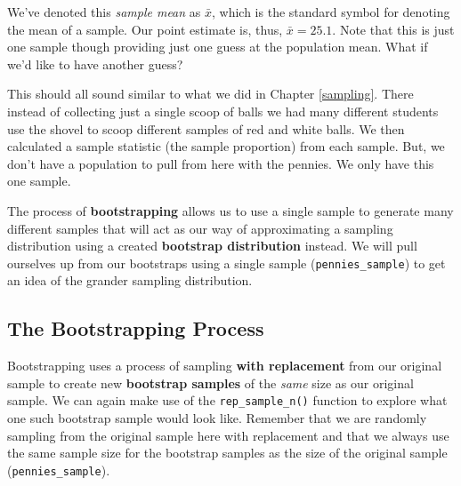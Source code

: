 \documentclass[12pt, krantz2,]{krantz}
\makeatletter
\newenvironment{Shaded}{\begin{snugshade}}{\end{snugshade}}
\newcommand{\DataTypeTok}[1]{\textcolor[rgb]{0.27,0.27,0.27}{#1}}
\newcommand{\DecValTok}[1]{\textcolor[rgb]{0.06,0.06,0.06}{#1}}
\newcommand{\KeywordTok}[1]{\textcolor[rgb]{0.27,0.27,0.27}{\textbf{#1}}}
\newcommand{\NormalTok}[1]{#1}
\newcommand{\OperatorTok}[1]{\textcolor[rgb]{0.43,0.43,0.43}{\textbf{#1}}}
\newcommand{\OtherTok}[1]{\textcolor[rgb]{0.37,0.37,0.37}{#1}}
\newcommand{\StringTok}[1]{\textcolor[rgb]{0.5,0.5,0.5}{#1}}
\newenvironment{kframe}{%
\medskip{}
\setlength{\fboxsep}{.8em}
 \def\at@end@of@kframe{}%
 \ifinner\ifhmode%
  \def\at@end@of@kframe{\end{minipage}}%
  \begin{minipage}{\columnwidth}%
 \fi\fi%
 \def\FrameCommand##1{\hskip\@totalleftmargin \hskip-\fboxsep
 \colorbox{shadecolor}{##1}\hskip-\fboxsep
     \hskip-\linewidth \hskip-\@totalleftmargin \hskip\columnwidth}%
 \MakeFramed {\advance\hsize-\width
   \@totalleftmargin\z@ \linewidth\hsize
   \@setminipage}}%
 {\par\unskip\endMakeFramed%
 \at@end@of@kframe}
\renewenvironment{Shaded}{\begin{kframe}}{\end{kframe}}
\makeatother
\begin{document}
We've denoted this \emph{sample mean} as \(\bar{x}\), which is the standard symbol for denoting the mean of a sample. Our point estimate is, thus, \(\bar{x} = 25.1\). Note that this is just one sample though providing just one guess at the population mean. What if we'd like to have another guess?

This should all sound similar to what we did in Chapter \ref{sampling}. There instead of collecting just a single scoop of balls we had many different students use the shovel to scoop different samples of red and white balls. We then calculated a sample statistic (the sample proportion) from each sample. But, we don't have a population to pull from here with the pennies. We only have this one sample.

The process of \textbf{bootstrapping} allows us to use a single sample to generate many different samples that will act as our way of approximating a sampling distribution using a created \textbf{bootstrap distribution} instead. We will pull ourselves up from our bootstraps using a single sample (\texttt{pennies\_sample}) to get an idea of the grander sampling distribution.

\hypertarget{bootstrap-process}{%
\subsection{The Bootstrapping Process}\label{bootstrap-process}}

Bootstrapping uses a process of sampling \textbf{with replacement} from our original sample to create new \textbf{bootstrap samples} of the \emph{same} size as our original sample. We can again make use of the \texttt{rep\_sample\_n()} function to explore what one such bootstrap sample would look like. Remember that we are randomly sampling from the original sample here with replacement and that we always use the same sample size for the bootstrap samples as the size of the original sample (\texttt{pennies\_sample}).

\begin{Shaded}
\end{Shaded}
\end{document}
